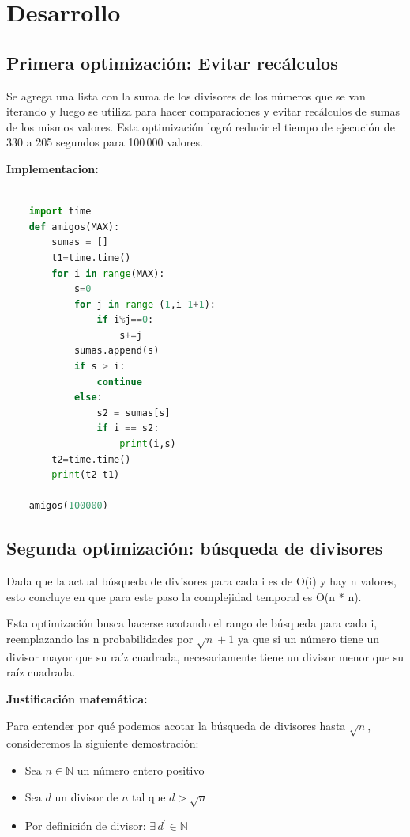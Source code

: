\section{Desarrollo}

\subsection{Primera optimización: Evitar recálculos}

Se agrega una lista con la suma de los divisores de los números que se van iterando y luego se utiliza para hacer comparaciones y evitar 
recálculos de sumas de los mismos valores. Esta optimización logró reducir el tiempo de ejecución de 330 a 205 segundos para 100\,000 valores.

\textbf{Implementacion:} 

\begin{lstlisting}[language=Python]

    import time
    def amigos(MAX):
        sumas = []
        t1=time.time()
        for i in range(MAX):
            s=0
            for j in range (1,i-1+1):
                if i%j==0:
                    s+=j
            sumas.append(s)
            if s > i:
                continue
            else:
                s2 = sumas[s]
                if i == s2:
                    print(i,s)       
        t2=time.time()    
        print(t2-t1)

    amigos(100000)
\end{lstlisting}

\subsection{Segunda optimización: búsqueda de divisores}

Dada que la actual búsqueda de divisores para cada i es de O(i) y hay n valores, esto concluye en que para este paso
la complejidad temporal es O(n * n).

Esta optimización busca hacerse acotando el rango de búsqueda para cada i, reemplazando las n probabilidades por $\sqrt{n} + 1$
ya que si un número tiene un divisor mayor que su raíz cuadrada, necesariamente tiene un divisor menor que su raíz cuadrada.

\textbf{Justificación matemática:} 

Para entender por qué podemos acotar la búsqueda de divisores hasta $\sqrt{n}$, consideremos la siguiente demostración:

\begin{itemize}
    \item Sea $n \in \mathbb{N}$ un número entero positivo
    \item Sea $d$ un divisor de $n$ tal que $d > \sqrt{n}$
    \item Por definición de divisor: $\exists \, d^{\prime} \in \mathbb{N}$
\end{itemize}


